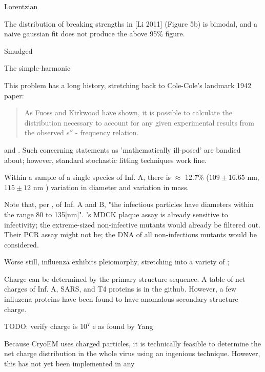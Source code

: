 \documentclass[paper.tex]{subfiles}
\begin{document}
Lorentzian 

The distribution of breaking strengths in [Li 2011] (Figure 5b) is bimodal, and a naive gaussian fit does not produce the above 95\% figure.

Smudged 

The simple-harmonic

This problem has a long history, stretching back to Cole-Cole's landmark 1942\cite{Dispersion1941} paper:

\begin{quote}
	As Fuoss and Kirkwood have shown, it is possible to calculate the distribution necessary to account for any given experimental results from the observed $\epsilon''$ - frequency relation.
\end{quote}

and \cite{Electrical1941}. Such concerning statements as 'mathematically ill-posed' are bandied about; however, standard stochastic fitting techniques work fine.



Within a sample of a single species of Inf. A, there is $\approx$ 12.7\%  ($109 \pm 16.65 \text{ nm}$\cite{lauffer1944biophysical}, $115 \pm 12 \text{ nm}$ \cite{Characterization1984}) variation in diameter and  \cite{Characterization1984} variation in mass.



Note that, per \cite{lauffer1944biophysical}, of Inf. A and B, "the infectious particles have diameters within the range 80 to 135[nm]". \cite{Efficient2015}'s MDCK plaque assay is already sensitive to infectivity; the extreme-sized non-infective mutants would already be filtered out. Their PCR assay might not be; the DNA of all non-infectious mutants would be considered.


Worse still, influenza exhibits pleiomorphy, stretching into a variety of \cite{Influenza2006}; 

Charge can be determined by the primary structure sequence. A table of net charges of Inf. A, SARS, and T4 proteins is in the github. However, a few influzena proteins have been found to have anomalous secondary structure charge.

TODO: verify charge is $10^7$ e as found by Yang

Because CryoEM uses charged particles, it is technically feasible to determine the net charge distribution in the whole virus using an ingenious \cite{Identification2018} technique. However, this has not yet been implemented in any
\end{document}
